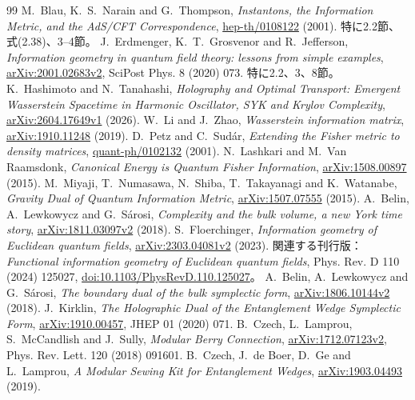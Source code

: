 \documentclass[a4paper,11pt]{ltjsarticle}
\numberwithin{equation}{section}
\begin{document}
\begin{thebibliography}{99}
 M.~Blau, K.~S.~Narain and G.~Thompson, \emph{Instantons, the Information Metric, and the AdS/CFT Correspondence}, \href{https://arxiv.org/abs/hep-th/0108122}{hep-th/0108122} (2001). 特に2.2節、式(2.38)、3--4節。
 J.~Erdmenger, K.~T.~Grosvenor and R.~Jefferson, \emph{Information geometry in quantum field theory: lessons from simple examples}, \href{https://arxiv.org/abs/2001.02683v2}{arXiv:2001.02683v2}, SciPost Phys. 8 (2020) 073. 特に2.2、3、8節。
 K.~Hashimoto and N.~Tanahashi, \emph{Holography and Optimal Transport: Emergent Wasserstein Spacetime in Harmonic Oscillator, SYK and Krylov Complexity}, \href{https://arxiv.org/abs/2604.17649v1}{arXiv:2604.17649v1} (2026).
 W.~Li and J.~Zhao, \emph{Wasserstein information matrix}, \href{https://arxiv.org/abs/1910.11248}{arXiv:1910.11248} (2019).
 D.~Petz and C.~Sud\'ar, \emph{Extending the Fisher metric to density matrices}, \href{https://arxiv.org/abs/quant-ph/0102132}{quant-ph/0102132} (2001).
 N.~Lashkari and M.~Van Raamsdonk, \emph{Canonical Energy is Quantum Fisher Information}, \href{https://arxiv.org/abs/1508.00897}{arXiv:1508.00897} (2015).
 M.~Miyaji, T.~Numasawa, N.~Shiba, T.~Takayanagi and K.~Watanabe, \emph{Gravity Dual of Quantum Information Metric}, \href{https://arxiv.org/abs/1507.07555}{arXiv:1507.07555} (2015).
 A.~Belin, A.~Lewkowycz and G.~S\'arosi, \emph{Complexity and the bulk volume, a new York time story}, \href{https://arxiv.org/abs/1811.03097v2}{arXiv:1811.03097v2} (2018).
 S.~Floerchinger, \emph{Information geometry of Euclidean quantum fields}, \href{https://arxiv.org/abs/2303.04081v2}{arXiv:2303.04081v2} (2023). 関連する刊行版：\emph{Functional information geometry of Euclidean quantum fields}, Phys. Rev. D 110 (2024) 125027, \href{https://doi.org/10.1103/PhysRevD.110.125027}{doi:10.1103/PhysRevD.110.125027}。
 A.~Belin, A.~Lewkowycz and G.~S\'arosi, \emph{The boundary dual of the bulk symplectic form}, \href{https://arxiv.org/abs/1806.10144v2}{arXiv:1806.10144v2} (2018).
 J.~Kirklin, \emph{The Holographic Dual of the Entanglement Wedge Symplectic Form}, \href{https://arxiv.org/abs/1910.00457}{arXiv:1910.00457}, JHEP 01 (2020) 071.
 B.~Czech, L.~Lamprou, S.~McCandlish and J.~Sully, \emph{Modular Berry Connection}, \href{https://arxiv.org/abs/1712.07123v2}{arXiv:1712.07123v2}, Phys. Rev. Lett. 120 (2018) 091601.
 B.~Czech, J.~de Boer, D.~Ge and L.~Lamprou, \emph{A Modular Sewing Kit for Entanglement Wedges}, \href{https://arxiv.org/abs/1903.04493}{arXiv:1903.04493} (2019).

\end{thebibliography}
\end{document}
